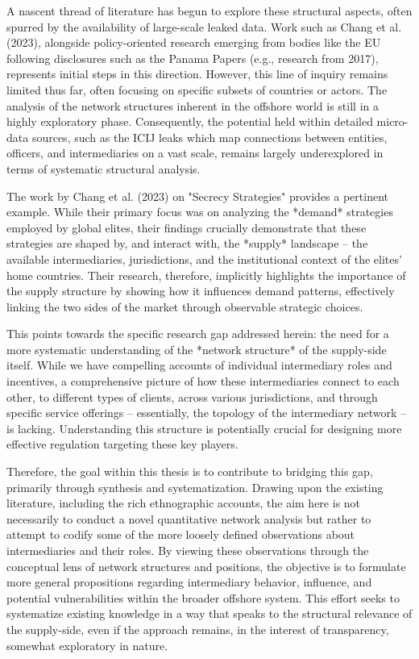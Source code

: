A nascent thread of literature has begun to explore these structural aspects, often spurred by the availability of large-scale leaked data. Work such as Chang et al. (2023), alongside policy-oriented research emerging from bodies like the EU following disclosures such as the Panama Papers (e.g., research from 2017), represents initial steps in this direction. However, this line of inquiry remains limited thus far, often focusing on specific subsets of countries or actors. The analysis of the network structures inherent in the offshore world is still in a highly exploratory phase. Consequently, the potential held within detailed micro-data sources, such as the ICIJ leaks which map connections between entities, officers, and intermediaries on a vast scale, remains largely underexplored in terms of systematic structural analysis.

The work by Chang et al. (2023) on "Secrecy Strategies" provides a pertinent example. While their primary focus was on analyzing the *demand* strategies employed by global elites, their findings crucially demonstrate that these strategies are shaped by, and interact with, the *supply* landscape – the available intermediaries, jurisdictions, and the institutional context of the elites' home countries. Their research, therefore, implicitly highlights the importance of the supply structure by showing how it influences demand patterns, effectively linking the two sides of the market through observable strategic choices.

This points towards the specific research gap addressed herein: the need for a more systematic understanding of the *network structure* of the supply-side itself. While we have compelling accounts of individual intermediary roles and incentives, a comprehensive picture of how these intermediaries connect to each other, to different types of clients, across various jurisdictions, and through specific service offerings – essentially, the topology of the intermediary network – is lacking. Understanding this structure is potentially crucial for designing more effective regulation targeting these key players.

Therefore, the goal within this thesis is to contribute to bridging this gap, primarily through synthesis and systematization. Drawing upon the existing literature, including the rich ethnographic accounts, the aim here is not necessarily to conduct a novel quantitative network analysis but rather to attempt to codify some of the more loosely defined observations about intermediaries and their roles. By viewing these observations through the conceptual lens of network structures and positions, the objective is to formulate more general propositions regarding intermediary behavior, influence, and potential vulnerabilities within the broader offshore system. This effort seeks to systematize existing knowledge in a way that speaks to the structural relevance of the supply-side, even if the approach remains, in the interest of transparency, somewhat exploratory in nature.


